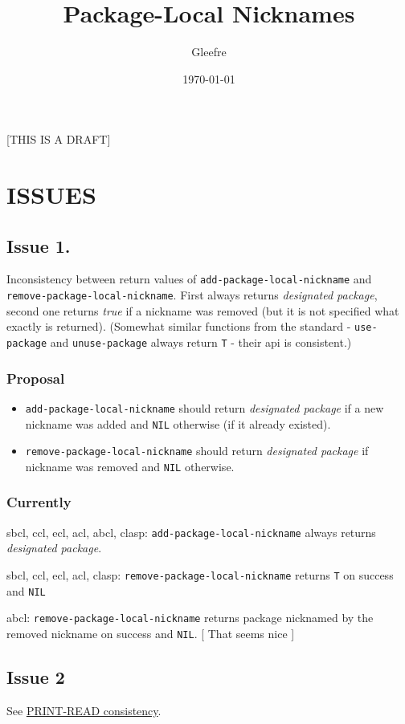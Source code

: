 \documentclass[11pt]{article}
\author{Gleefre}
\date{\today}
\title{Package-Local Nicknames}
\begin{document}
\maketitle
\tableofcontents

[THIS IS A DRAFT]

\section{ISSUES}
\label{sec:orgd3bca0d}
\subsection{Issue 1.}
\label{sec:orgb0a89ff}
Inconsistency between return values of \texttt{add-package-local-nickname} and
\texttt{remove-package-local-nickname}. First always returns \emph{designated package},
second one returns \emph{true} if a nickname was removed (but it is not specified
what exactly is returned). (Somewhat similar functions from the standard -
\texttt{use-package} and \texttt{unuse-package} always return \texttt{T} - their api is
consistent.)
\subsubsection{Proposal}
\label{sec:org5466a51}
\begin{itemize}
\item \texttt{add-package-local-nickname} should return \emph{designated package} if a new
nickname was added and \texttt{NIL} otherwise (if it already existed).
\item \texttt{remove-package-local-nickname} should return \emph{designated package} if
nickname was removed and \texttt{NIL} otherwise.
\end{itemize}
\subsubsection{Currently}
\label{sec:orgab14262}
sbcl, ccl, ecl, acl, abcl, clasp: \texttt{add-package-local-nickname} always returns
\emph{designated package}.

sbcl, ccl, ecl, acl, clasp: \texttt{remove-package-local-nickname} returns \texttt{T} on
success and \texttt{NIL}

abcl: \texttt{remove-package-local-nickname} returns package nicknamed by the
removed nickname on success and \texttt{NIL}.  [ That seems nice ]
\subsection{Issue 2}
\label{sec:orgf1bd544}
See \hyperref[sec:org175afae]{PRINT-READ consistency}.
\end{document}
